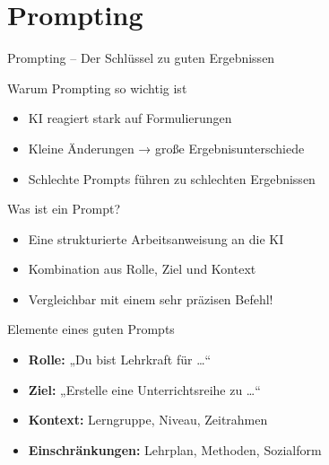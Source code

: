 \documentclass[14pt, aspectratio=169]{beamer}
\begin{document}

\section{Prompting}
\begin{frame}{}
\begin{center}
    \Large Prompting – Der Schlüssel zu guten Ergebnissen
\end{center}
\end{frame}

\begin{frame}{Warum Prompting so wichtig ist}
\begin{itemize}
    \item KI reagiert stark auf Formulierungen
    \item Kleine Änderungen → große Ergebnisunterschiede
    \item Schlechte Prompts führen zu schlechten Ergebnissen
\end{itemize}
\end{frame}

\begin{frame}{Was ist ein Prompt?}
\begin{itemize}
    \item Eine strukturierte Arbeitsanweisung an die KI
    \item Kombination aus Rolle, Ziel und Kontext
    \item Vergleichbar mit einem sehr präzisen Befehl!
\end{itemize}
\end{frame}

\begin{frame}{Elemente eines guten Prompts}
\begin{itemize}
    \item \textbf{Rolle:} „Du bist Lehrkraft für …“
    \item \textbf{Ziel:} „Erstelle eine Unterrichtsreihe zu …“
    \item \textbf{Kontext:} Lerngruppe, Niveau, Zeitrahmen
    \item \textbf{Einschränkungen:} Lehrplan, Methoden, Sozialform
\end{itemize}
\end{frame}
\end{document}
